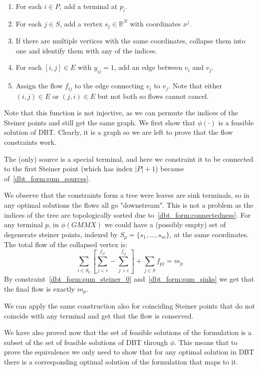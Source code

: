 \documentclass[11pt,reqno,a4paper]{amsart}
\numberwithin{equation}{section}
\theoremstyle{mytheorem}
\theoremstyle{myremark}
\theoremstyle{myparagraph}
\newcommand{\R}{\mathbb{R}}
\begin{document}
    \begin{enumerate}
        \item For each $i \in P$, add a terminal at $p_i$.
        \item For each $j \in S$, add a vertex $s_j \in \R^N$ with coordinates $x^j$.
        \item If there are multiple vertices with the same coordinates, collapse them into one and identify them with any of the indices.
        \item For each $[i,j] \in E$ with $y_{ij} = 1$, add an edge between $v_i$ and $v_j$.
        \item Assign the flow $f_{ij}$ to the edge connecting $v_i$ to $v_j$. Note that either $(i,j) \in E$ or $(j,i) \in E$ but not both so flows
        cannot cancel.
    \end{enumerate}

    Note that this function is not injective, as we can permute the indices of the Steiner points and still get the same graph.
    We first show that $\phi(\cdot)$ is a feasible solution of DBT. Clearly, it is a graph so we are left to prove that the flow
    constraints work.

    The (only) source is a special terminal, and here we constraint it to be connected
    to the first Steiner point (which has index $|P|+1$) because of~\ref{dbt_form:sum_sources}.

    We observe that the constraints form a tree were leaves are sink terminals, so in any optimal solutions the flows all go "downstream".
    This is not a problem as the indices of the tree are topologically sorted due to~\ref{dbt_form:connectedness}.
    For any terminal $p$, in $\phi(GMMX)$ we could have a (possibly empty) set of degenerate steiner points, indexed by $S_p = \{s_1, \dots, s_m\}$,
    at the same coordinates.
    The total flow of the collapsed vertex is:
    \begin{equation}
        \sum_{i \in S_p} \left[ \sum_{j<i}^{f_{ji}} - \sum_{j>i}^{f_{ij}}   \right] + \sum_{j \in S} f_{pj} = m_p
    \end{equation}
    By constraint~\ref{dbt_form:sum_steiner_0} and~\ref{dbt_form:sum_sinks} we get that the final flow is exactly $m_p$.

    We can apply the same construction also for coinciding Steiner points that do not coincide with any terminal and get
    that the flow is conserved.

    We have also proved now that the set of feasible solutions of the formulation is a subset of the set of feasible solutions of DBT through $\phi$.
    This means that to prove the equivalence we only need to show that for any optimal solution in DBT
    there is a corresponding optimal solution of the formulation that maps to it.
\end{document}
